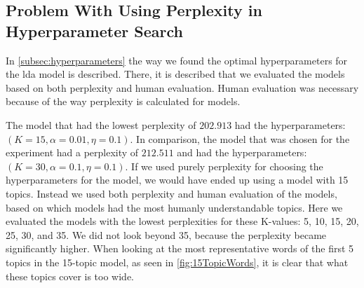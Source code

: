 \subsection{Problem With Using Perplexity in Hyperparameter Search}
In \autoref{subsec:hyperparameters} the way we found the optimal hyperparameters for the \gls{lda} model is described.
There, it is described that we evaluated the models based on both perplexity and human evaluation.
Human evaluation was necessary because of the way perplexity is calculated for models.

The model that had the lowest perplexity of $202.913$ had the hyperparameters: $(K=15, \alpha =0.01, \eta =0.1)$.
In comparison, the model that was chosen for the experiment had a perplexity of $212.511$ and had the hyperparameters: $(K=30, \alpha =0.1, \eta =0.1)$.
If we used purely perplexity for choosing the hyperparameters for the model, we would have ended up using a model with 15 topics.
Instead we used both perplexity and human evaluation of the models, based on which models had the most humanly understandable topics.
Here we evaluated the models with the lowest perplexities for these K-values: 5, 10, 15, 20, 25, 30, and 35.
We did not look beyond 35, because the perplexity became significantly higher.
When looking at the most representative words of the first 5 topics in the 15-topic model, as seen in \autoref{fig:15TopicWords}, it is clear that what these topics cover is too wide.


